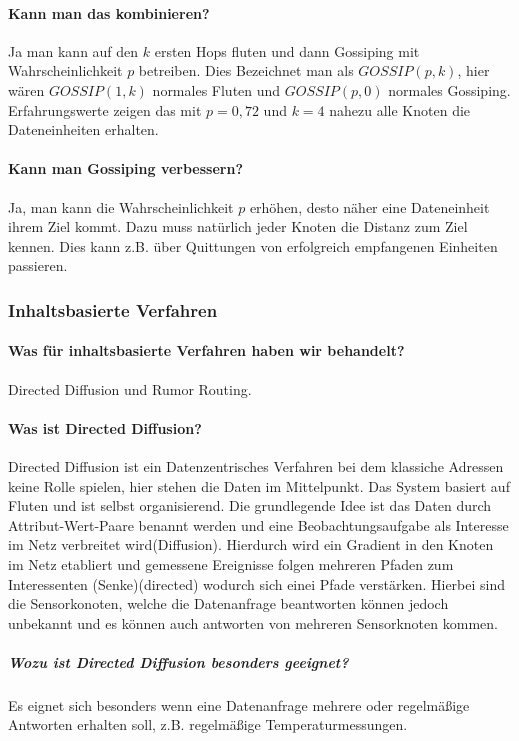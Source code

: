\paragraph{Kann man das kombinieren?}
Ja man kann auf den $k$ ersten Hops fluten und dann Gossiping mit Wahrscheinlichkeit $p$ betreiben. Dies Bezeichnet man als $GOSSIP(p,k)$, hier wären $GOSSIP(1,k)$ normales Fluten und $GOSSIP(p,0)$ normales Gossiping. Erfahrungswerte zeigen das mit $p=0,72$ und $k=4$ nahezu alle Knoten die Dateneinheiten erhalten.

\paragraph{Kann man Gossiping verbessern?}
	Ja, man kann die Wahrscheinlichkeit $p$  erhöhen, desto näher eine Dateneinheit ihrem Ziel kommt. Dazu muss natürlich jeder Knoten die Distanz zum Ziel kennen. Dies kann z.B. über Quittungen von erfolgreich empfangenen Einheiten passieren.
	
	\subsubsection{Inhaltsbasierte Verfahren}
	\paragraph{Was für inhaltsbasierte Verfahren haben wir behandelt?}
	Directed Diffusion und Rumor Routing.
	
	\paragraph{Was ist Directed Diffusion?}
	Directed Diffusion ist ein Datenzentrisches Verfahren bei dem klassiche Adressen keine Rolle spielen, hier stehen die Daten im Mittelpunkt. Das System basiert auf Fluten und ist selbst organisierend.
	Die grundlegende Idee ist das Daten durch Attribut-Wert-Paare benannt werden und eine Beobachtungsaufgabe als Interesse im Netz verbreitet wird(Diffusion). Hierdurch wird ein Gradient in den Knoten im Netz etabliert und gemessene Ereignisse folgen mehreren Pfaden zum Interessenten (Senke)(directed) wodurch sich einei Pfade verstärken. Hierbei sind die Sensorkonoten, welche die Datenanfrage beantworten können jedoch unbekannt und es können auch antworten von mehreren Sensorknoten kommen.
	\subparagraph{Wozu ist Directed Diffusion besonders geeignet?}
	Es eignet sich besonders wenn eine Datenanfrage mehrere oder regelmäßige Antworten erhalten soll, z.B. regelmäßige Temperaturmessungen.
	
